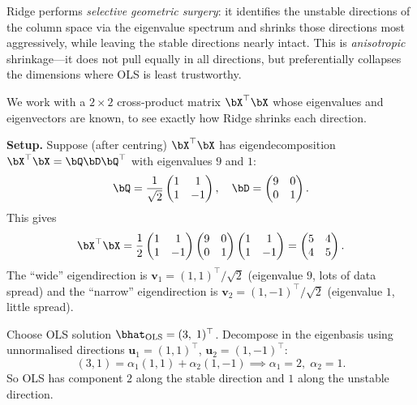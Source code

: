 \begin{keyinsight}
Ridge performs \emph{selective geometric surgery}: it identifies the
unstable directions of the column space via the eigenvalue spectrum
and shrinks those directions most aggressively, while leaving the
stable directions nearly intact.
This is \emph{anisotropic} shrinkage---it does not pull equally in
all directions, but preferentially collapses the dimensions where OLS
is least trustworthy.
\end{keyinsight}



\begin{example}\label{ex:ridge}
We work with a $2\times 2$ cross-product matrix $\bX^\top\bX$ whose
eigenvalues and eigenvectors are known, to see exactly how Ridge shrinks
each direction.

\medskip\noindent\textbf{Setup.}
Suppose (after centring) $\bX^\top\bX$ has eigendecomposition
$\bX^\top\bX = \bQ\bD\bQ^\top$ with eigenvalues $9$ and $1$:
\[
\bQ = \frac{1}{\sqrt{2}}\begin{pmatrix}1&1\\1&-1\end{pmatrix},\quad
\bD = \begin{pmatrix}9&0\\0&1\end{pmatrix}.
\]
This gives
\[
\bX^\top\bX
= \frac{1}{2}\begin{pmatrix}1&1\\1&-1\end{pmatrix}
\begin{pmatrix}9&0\\0&1\end{pmatrix}
\begin{pmatrix}1&1\\1&-1\end{pmatrix}
= \begin{pmatrix}5&4\\4&5\end{pmatrix}.
\]
The ``wide'' eigendirection is
$\bm{v}_1 = (1,1)^\top/\sqrt{2}$ (eigenvalue $9$, lots of data spread)
and the ``narrow'' eigendirection is
$\bm{v}_2 = (1,-1)^\top/\sqrt{2}$ (eigenvalue $1$, little spread).

Choose OLS solution $\bhat_{\text{OLS}} = (3,\;1)^\top$.
Decompose in the eigenbasis using unnormalised directions
$\bm{u}_1 = (1,1)^\top$, $\bm{u}_2 = (1,-1)^\top$:
\[
(3,1) = \alpha_1(1,1) + \alpha_2(1,-1)
\implies \alpha_1 = 2,\;\alpha_2 = 1.
\]
So OLS has component $2$ along the stable direction and $1$ along
the unstable direction.


\end{example}
